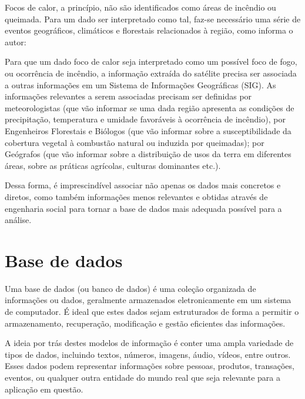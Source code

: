 \documentclass[tcc2]{uftex}
\begin{document}
Focos de calor, a princípio, não são identificados como áreas de incêndio ou queimada. Para um dado ser interpretado como tal, faz-se necessário uma série de eventos geográficos, climáticos e florestais relacionados à região, como informa o autor:

\noindent
\begin{quoting}[rightmargin=0cm,leftmargin=4cm]
\begin{singlespace}
{\footnotesize
Para que um dado foco de calor seja interpretado como um possível foco de fogo, ou ocorrência de incêndio, a informação extraída do satélite precisa ser associada a outras informações em um Sistema de Informações Geográficas (SIG). As informações relevantes a serem associadas precisam ser definidas por meteorologistas (que vão informar se uma dada região apresenta as condições de precipitação, temperatura e umidade favoráveis à ocorrência de incêndio), por Engenheiros Florestais e Biólogos (que vão informar sobre a susceptibilidade da cobertura vegetal à combustão natural ou induzida por queimadas); por Geógrafos (que vão informar sobre a distribuição de usos da terra em diferentes áreas, sobre as práticas agrícolas, culturas dominantes etc.). \cite[p. 32]{novo10}
}
\end{singlespace}
\end{quoting}

Dessa forma, é imprescindível associar não apenas os dados mais concretos e diretos, como também informações menos relevantes e obtidas através de engenharia social para tornar a base de dados mais adequada possível para a análise.

\section{Base de dados}

Uma base de dados (ou banco de dados) é uma coleção organizada de informações ou dados, geralmente armazenados eletronicamente em um sistema de computador. É ideal que estes dados sejam estruturados de forma a permitir o armazenamento, recuperação, modificação e gestão eficientes das informações.

A ideia por trás destes modelos de informação é conter uma ampla variedade de tipos de dados, incluindo textos, números, imagens, áudio, vídeos, entre outros. Esses dados podem representar informações sobre pessoas, produtos, transações, eventos, ou qualquer outra entidade do mundo real que seja relevante para a aplicação em questão.
\end{document}
